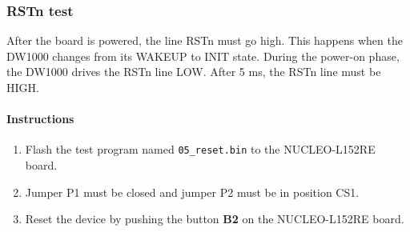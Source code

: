 \documentclass[journal,comsoc]{IEEEtran}
\begin{document}
\vspace*{1em}
\subsubsection{RSTn test}
\label{subsubsec:rstntest}
After the board is powered, the line RSTn must go high. This happens when the DW1000 changes from its WAKEUP to INIT state. During the power-on phase, the DW1000 drives the RSTn line LOW. After 5 ms, the RSTn line must be HIGH.
\paragraph{Instructions}
\begin{enumerate}
	\item Flash the test program named \texttt{05\_reset.bin} to the NUCLEO-L152RE board.
	\item Jumper P1 must be closed and jumper P2 must be in position CS1. 
	\item Reset the device by pushing the button \textbf{B2} on the NUCLEO-L152RE board.
\end{enumerate}

\vspace*{1em}
\end{document}
